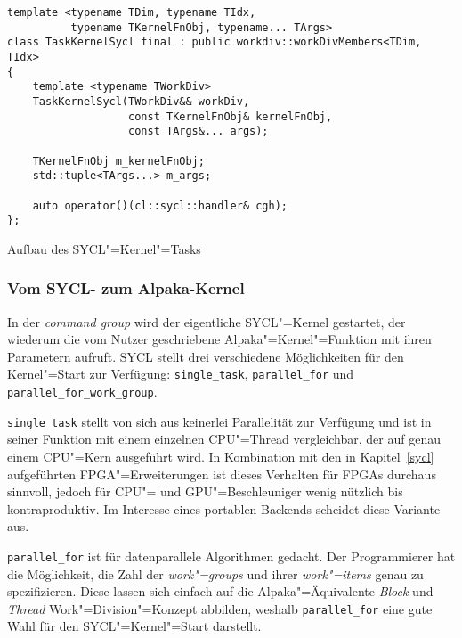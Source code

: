 \begin{code}
    \begin{verbatim}
template <typename TDim, typename TIdx,
          typename TKernelFnObj, typename... TArgs>
class TaskKernelSycl final : public workdiv::workDivMembers<TDim, TIdx>
{
    template <typename TWorkDiv>
    TaskKernelSycl(TWorkDiv&& workDiv,
                   const TKernelFnObj& kernelFnObj,
                   const TArgs&... args);

    TKernelFnObj m_kernelFnObj;
    std::tuple<TArgs...> m_args;

    auto operator()(cl::sycl::handler& cgh);
};
    \end{verbatim}
    \caption{Aufbau des SYCL"=Kernel"=Tasks}
    \label{implementierung:task:kernel:struktur}
\end{code}

\subsubsection{Vom SYCL- zum Alpaka-Kernel}
\label{implementierung:task:kernel:launch}

In der \textit{command group} wird der eigentliche SYCL"=Kernel gestartet, der
wiederum die vom Nutzer geschriebene Alpaka"=Kernel"=Funktion mit ihren
Parametern aufruft. SYCL stellt drei verschiedene Möglichkeiten für den
Kernel"=Start zur Verfügung: \texttt{single\_task}, \texttt{parallel\_for} und
\texttt{parallel\_for\_work\_group}.

\texttt{single\_task} stellt von sich aus keinerlei Parallelität zur Verfügung
und ist in seiner Funktion mit einem einzelnen CPU"=Thread vergleichbar, der auf
genau einem CPU"=Kern ausgeführt wird. In Kombination mit den in
Kapitel~\ref{sycl} aufgeführten FPGA"=Erweiterungen ist dieses Verhalten für
FPGAs durchaus sinnvoll, jedoch für CPU"= und GPU"=Beschleuniger wenig nützlich
bis kontraproduktiv. Im Interesse eines portablen Backends scheidet diese
Variante aus.

\texttt{parallel\_for} ist für datenparallele Algorithmen gedacht. Der
Programmierer hat die Möglichkeit, die Zahl der \textit{work"=groups} und ihrer
\textit{work"=items} genau zu spezifizieren. Diese lassen sich einfach auf die
Alpaka"=Äquivalente \textit{Block} und \textit{Thread} Work"=Division"=Konzept
abbilden, weshalb \texttt{parallel\_for} eine gute Wahl für den
SYCL"=Kernel"=Start darstellt.

